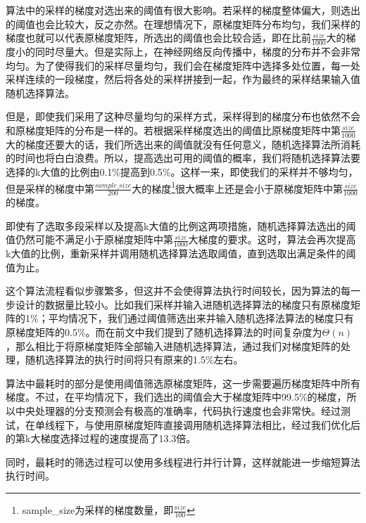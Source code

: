 算法中的采样的梯度对选出来的阈值有很大影响。若采样的梯度整体偏大，则选出的阈值也会比较大，反之亦然。在理想情况下，原梯度矩阵分布均匀，我们采样的梯度也就可以代表原梯度矩阵，所选出的阈值也会比较合适，即在比前$\frac{size}{1000}$大的梯度小的同时尽量大。但是实际上，在神经网络反向传播中，梯度的分布并不会非常均匀。为了使得我们的采样尽量均匀，我们会在梯度矩阵中选择多处位置，每一处采样连续的一段梯度，然后将各处的采样拼接到一起，作为最终的采样结果输入值随机选择算法。

但是，即使我们采用了这种尽量均匀的采样方式，采样得到的梯度分布也依然不会和原梯度矩阵的分布是一样的。若根据采样梯度选出的阈值比原梯度矩阵中第$\frac{size}{1000}$大的梯度还要大的话，我们所选出来的阈值就没有任何意义，随机选择算法所消耗的时间也将白白浪费。所以，提高选出可用的阈值的概率，我们将随机选择算法要选择的k大值的比例由0.1\%提高到0.5\%。这样一来，即使我们的采样并不够均匀，但是采样的梯度中第$\frac{sample\_size}{200}$大的梯度\footnote{sample\_size为采样的梯度数量，即$\frac{size}{100}$}很大概率上还是会小于原梯度矩阵中第$\frac{size}{1000}$的梯度。

即使有了选取多段采样以及提高k大值的比例这两项措施，随机选择算法选出的阈值仍然可能不满足小于原梯度矩阵中第$\frac{size}{1000}$大梯度的要求。这时，算法会再次提高k大值的比例，重新采样并调用随机选择算法选取阈值，直到选取出满足条件的阈值为止。

这个算法流程看似步骤繁多，但这并不会使得算法执行时间较长，因为算法的每一步设计的数据量比较小。比如我们采样并输入进随机选择算法的梯度只有原梯度矩阵的1\%；平均情况下，我们通过阈值筛选出来并输入随机选择法算法的梯度只有原梯度矩阵的0.5\%。而在前文中我们提到了随机选择算法的时间复杂度为$\Theta(n)$，那么相比于将原梯度矩阵全部输入进随机选择算法，通过我们对梯度矩阵的处理，随机选择算法的执行时间将只有原来的1.5\%左右。

算法中最耗时的部分是使用阈值筛选原梯度矩阵，这一步需要遍历梯度矩阵中所有梯度。不过，在平均情况下，我们选出的阈值会大于梯度矩阵中99.5\%的梯度，所以中央处理器的分支预测会有极高的准确率，代码执行速度也会非常快。经过测试，在单线程下，与使用原梯度矩阵直接调用随机选择算法相比，经过我们优化后的第k大梯度选择过程的速度提高了13.3倍。

同时，最耗时的筛选过程可以使用多线程进行并行计算，这样就能进一步缩短算法执行时间。